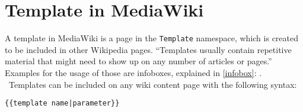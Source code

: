 \section{Template in MediaWiki}

A template in MediaWiki is a page in the \texttt{\justify Template} namespace, which is created to be included in other Wikipedia pages. ``Templates usually contain repetitive material that might need to show up on any number of articles or pages.'' \citep{wiki:21} Examples for the usage of those are infoboxes, explained in \ref{infobox}: . \\\
Templates can be included on any wiki content page with the following syntax:
\begin{lstlisting}[frame=single] 
{{template name|parameter}}
\end{lstlisting}